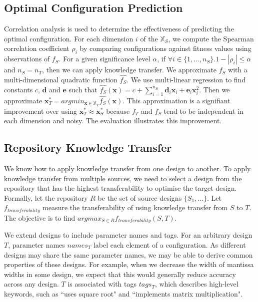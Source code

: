 \documentclass[10pt,a4paper]{article}
\begin{document}
\subsection{Optimal Configuration Prediction}
Correlation analysis is used to determine the effectiveness of predicting the optimal configuration. For each dimension $i$ of the $\mathbb{X}_S$, we compute the Spearman correlation coefficient $\rho_i$ by comparing configurations against fitness values using observations of $f_S$. For a given significance level $\alpha$, if $\forall i\in\{1,...,n_S\}.1-|\rho_i|\le\alpha$ and $n_S=n_T$, then we can apply knowledge transfer. We approximate $f_S$ with a multi-dimensional quadratic function $\hat{f_S}$. We use multi-linear regression to find constants $c$, $\mathbf{d}$ and $\mathbf{e}$ such that $\hat{f_S}(\mathbf{x})=c+\sum_{i=1}^{n_S}\mathbf{d}_i \mathbf{x}_i+\mathbf{e}_i \mathbf{x}_i^2$. Then we approximate $\mathbf{x}_T^*=argmin_{\mathbf{x}\in\mathbb{X}_T}\hat{f_S}(\mathbf{x})$. This approximation is a signifiant improvement over using $\mathbf{x}_T^*\approx\mathbf{x}_S^*$ because $f_T$ and $f_S$ tend to be independent in each dimension and noisy\cite{Xi2004}. The evaluation illustrates this improvement.

\subsection{Repository Knowledge Transfer}

We know how to apply knowledge transfer from one design to another. To apply knowledge transfer from multiple sources, we need to select a design from the repository that has the highest transferability to optimise the target design. Formally, let the repository $R$ be the set of source designs $\{S_1,...\}$. Let $f_{transferability}$ measure the transferability of using knowledge transfer from $S$ to $T$. The objective is to find $argmax_{S\in R}f_{transferability}(S,T)$.

We extend designs to include parameter names and tags. For an arbitrary design $T$, parameter names $names_T$ label each element of a configuration. As different designs may share the same parameter names, we may be able to derive common properties of these designs. For example, when we decrease the width of mantissa widths in some design, we expect that this would generally reduce accuracy across any design. $T$ is associated with tags $tags_T$, which describes high-level keywords, such as ``uses square root" and ``implements matrix multiplication".
\end{document}
